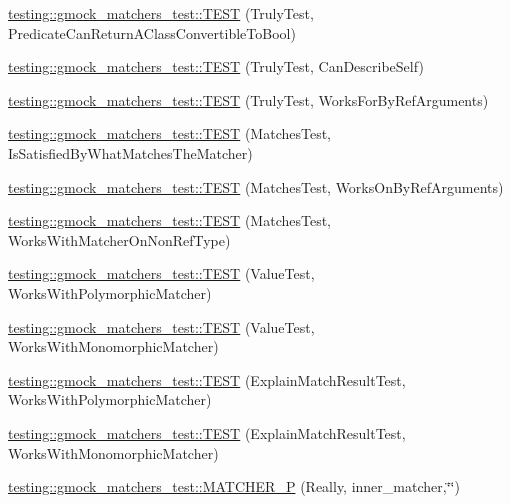 \begin{DoxyCompactItemize}
\item 
\hyperlink{namespacetesting_1_1gmock__matchers__test_a24529fd7834d272009af74106422fe54}{testing\+::gmock\+\_\+matchers\+\_\+test\+::\+T\+E\+ST} (Truly\+Test, Predicate\+Can\+Return\+A\+Class\+Convertible\+To\+Bool)
\item 
\hyperlink{namespacetesting_1_1gmock__matchers__test_af474a9719e614d521c71bdf7c39f6a7a}{testing\+::gmock\+\_\+matchers\+\_\+test\+::\+T\+E\+ST} (Truly\+Test, Can\+Describe\+Self)
\item 
\hyperlink{namespacetesting_1_1gmock__matchers__test_ae702d436c52bd37fe3e8d405d7e6a691}{testing\+::gmock\+\_\+matchers\+\_\+test\+::\+T\+E\+ST} (Truly\+Test, Works\+For\+By\+Ref\+Arguments)
\item 
\hyperlink{namespacetesting_1_1gmock__matchers__test_a6617484cbb644af9882fc5d853112aae}{testing\+::gmock\+\_\+matchers\+\_\+test\+::\+T\+E\+ST} (Matches\+Test, Is\+Satisfied\+By\+What\+Matches\+The\+Matcher)
\item 
\hyperlink{namespacetesting_1_1gmock__matchers__test_a6cfa391c9035262ccdc0d8f59e037b4d}{testing\+::gmock\+\_\+matchers\+\_\+test\+::\+T\+E\+ST} (Matches\+Test, Works\+On\+By\+Ref\+Arguments)
\item 
\hyperlink{namespacetesting_1_1gmock__matchers__test_a9fd734ae5afb64a7285503bc0870c255}{testing\+::gmock\+\_\+matchers\+\_\+test\+::\+T\+E\+ST} (Matches\+Test, Works\+With\+Matcher\+On\+Non\+Ref\+Type)
\item 
\hyperlink{namespacetesting_1_1gmock__matchers__test_a150118d4e990ba9fb9978329e742c931}{testing\+::gmock\+\_\+matchers\+\_\+test\+::\+T\+E\+ST} (Value\+Test, Works\+With\+Polymorphic\+Matcher)
\item 
\hyperlink{namespacetesting_1_1gmock__matchers__test_a53403682e9ffc12152b0b1c7f55dfa12}{testing\+::gmock\+\_\+matchers\+\_\+test\+::\+T\+E\+ST} (Value\+Test, Works\+With\+Monomorphic\+Matcher)
\item 
\hyperlink{namespacetesting_1_1gmock__matchers__test_a985e2bc1546b67de764d759de111e8e9}{testing\+::gmock\+\_\+matchers\+\_\+test\+::\+T\+E\+ST} (Explain\+Match\+Result\+Test, Works\+With\+Polymorphic\+Matcher)
\item 
\hyperlink{namespacetesting_1_1gmock__matchers__test_aeff2711a03b27a66c1c98ed97ff49b09}{testing\+::gmock\+\_\+matchers\+\_\+test\+::\+T\+E\+ST} (Explain\+Match\+Result\+Test, Works\+With\+Monomorphic\+Matcher)
\item 
\hyperlink{namespacetesting_1_1gmock__matchers__test_ae59dd69f7bc69e592dc851fef825d0ba}{testing\+::gmock\+\_\+matchers\+\_\+test\+::\+M\+A\+T\+C\+H\+E\+R\+\_\+P} (Really, inner\+\_\+matcher,\char`\"{}\char`\"{})

\end{DoxyCompactItemize}
